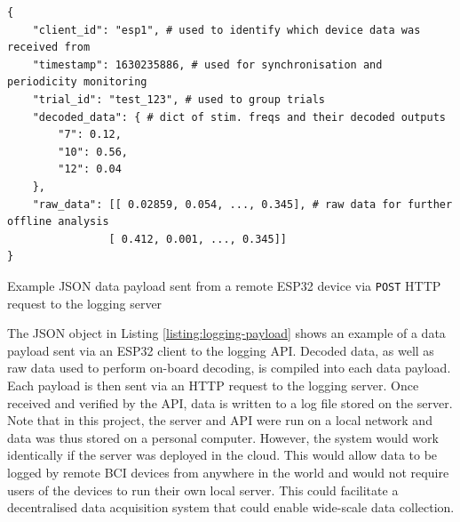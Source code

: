 \begin{listing}[h]
\small
\begin{verbatim}
{
    "client_id": "esp1", # used to identify which device data was received from
    "timestamp": 1630235886, # used for synchronisation and periodicity monitoring
    "trial_id": "test_123", # used to group trials 
    "decoded_data": { # dict of stim. freqs and their decoded outputs
        "7": 0.12,
        "10": 0.56, 
        "12": 0.04
    },
    "raw_data": [[ 0.02859, 0.054, ..., 0.345], # raw data for further offline analysis
                [ 0.412, 0.001, ..., 0.345]]
}

\end{verbatim}
\caption{Example JSON data payload sent from a remote ESP32 device via \texttt{POST} HTTP request to the logging server}
\label{listing:logging-payload}
\end{listing}
The JSON object in Listing \ref{listing:logging-payload} shows an example of a data payload sent via an ESP32 client to the logging API. Decoded data, as well as raw data used to perform on-board decoding, is compiled into each data payload. Each payload is then sent via an HTTP  request to the logging server. Once received and verified by the API, data is written to a log file stored on the server. Note that in this project, the server and API were run on a local network and data was thus stored on a personal computer. However, the system would work identically if the server was deployed in the cloud. This would allow data to be logged by remote BCI devices from anywhere in the world and would not require users of the devices to run their own local server. This could facilitate a decentralised data acquisition system that could enable wide-scale data collection.  

